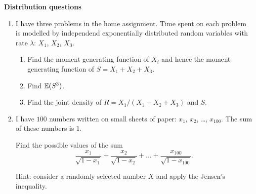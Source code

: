     \textbf{Distribution questions}

    \begin{enumerate}[resume]
    \item I have three problems in the home assignment. 
    Time spent on each problem is modelled by independend exponentially distributed random variables with rate $\lambda$: $X_1$, $X_2$, $X_3$.

    \begin{enumerate}
        \item Find the moment generating function of $X_i$ and hence the moment generating function of $S = X_1 + X_2 + X_3$.
        \item Find $\operatorname{\mathbb{E}}(S^3)$.
        \item Find the joint density of $R = X_1 / (X_1 + X_2 + X_3)$ and $S$.
    \end{enumerate}

    \item I have $100$ numbers written on small sheets of paper: $x_1$, $x_2$, \ldots, $x_{100}$. The sum of these numbers is $1$. 
    
    Find the possible values of the sum 
    \[
    \frac{x_1}{\sqrt{1-x_1}} +     \frac{x_2}{\sqrt{1-x_2}} + \ldots + \frac{x_{100}}{\sqrt{1-x_{100}}}.
    \]
    

    Hint: consider a randomly selected number $X$ and apply the Jensen's inequality.
    
 
\end{enumerate}
